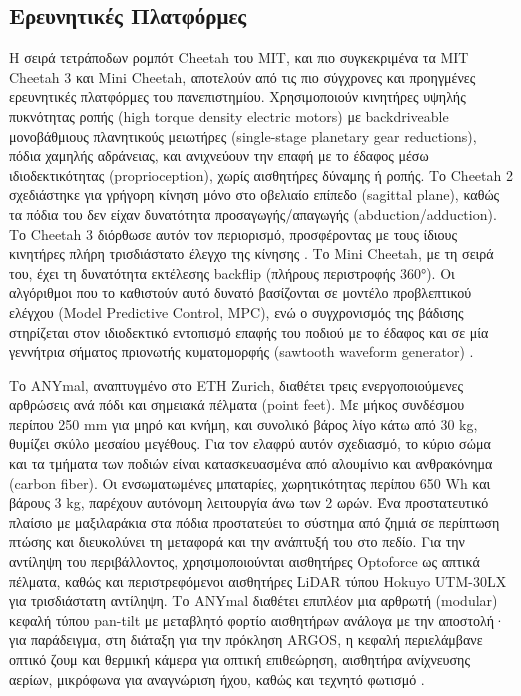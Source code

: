 \documentclass[11pt]{report}
\begin{document}
\subsection{Ερευνητικές Πλατφόρμες}
Η σειρά τετράποδων ρομπότ Cheetah του MIT, και πιο συγκεκριμένα τα MIT Cheetah 3
και Mini Cheetah, αποτελούν από τις πιο σύγχρονες και προηγμένες ερευνητικές
πλατφόρμες του πανεπιστημίου. Χρησιμοποιούν κινητήρες υψηλής πυκνότητας ροπής
(high torque density electric motors) με backdriveable μονοβάθμιους πλανητικούς
μειωτήρες (single-stage planetary gear reductions), πόδια χαμηλής αδράνειας, και
ανιχνεύουν την επαφή με το έδαφος μέσω ιδιοδεκτικότητας (proprioception), χωρίς
αισθητήρες δύναμης ή ροπής. Το Cheetah 2 σχεδιάστηκε για γρήγορη κίνηση μόνο στο
οβελιαίο επίπεδο (sagittal plane), καθώς τα πόδια του δεν είχαν δυνατότητα
προσαγωγής/απαγωγής (abduction/adduction). Το Cheetah 3 διόρθωσε αυτόν τον
περιορισμό, προσφέροντας με τους ίδιους κινητήρες πλήρη τρισδιάστατο έλεγχο της
κίνησης \cite{hyun_high_2014,bledt_mit_2018}. Το Mini Cheetah, με τη σειρά του,
έχει τη δυνατότητα εκτέλεσης backflip (πλήρους περιστροφής 360°). Οι αλγόριθμοι
που το καθιστούν αυτό δυνατό βασίζονται σε μοντέλο προβλεπτικού ελέγχου (Model
Predictive Control, MPC), ενώ ο συγχρονισμός της βάδισης στηρίζεται στον
ιδιοδεκτικό εντοπισμό επαφής του ποδιού με το έδαφος και σε μία γεννήτρια
σήματος πριονωτής κυματομορφής (sawtooth waveform generator)
\cite{kim_highly_2019}.

Το ANYmal, αναπτυγμένο στο ETH Zurich, διαθέτει τρεις ενεργοποιούμενες αρθρώσεις
ανά πόδι και σημειακά πέλματα (point feet). Με μήκος συνδέσμου περίπου 250 mm
για μηρό και κνήμη, και συνολικό βάρος λίγο κάτω από 30 kg, θυμίζει σκύλο
μεσαίου μεγέθους. Για τον ελαφρύ αυτόν σχεδιασμό, το κύριο σώμα και τα τμήματα
των ποδιών είναι κατασκευασμένα από αλουμίνιο και ανθρακόνημα (carbon fiber). Οι
ενσωματωμένες μπαταρίες, χωρητικότητας περίπου 650 Wh και βάρους 3 kg, παρέχουν
αυτόνομη λειτουργία άνω των 2 ωρών. Ένα προστατευτικό πλαίσιο με μαξιλαράκια στα
πόδια προστατεύει το σύστημα από ζημιά σε περίπτωση πτώσης και διευκολύνει τη
μεταφορά και την ανάπτυξή του στο πεδίο. Για την αντίληψη του περιβάλλοντος,
χρησιμοποιούνται αισθητήρες Optoforce ως απτικά πέλματα, καθώς και
περιστρεφόμενοι αισθητήρες LiDAR τύπου Hokuyo UTM-30LX για τρισδιάστατη
αντίληψη. Το ANYmal διαθέτει επιπλέον μια αρθρωτή (modular) κεφαλή τύπου
pan-tilt με μεταβλητό φορτίο αισθητήρων ανάλογα με την αποστολή· για παράδειγμα,
στη διάταξη για την πρόκληση ARGOS, η κεφαλή περιελάμβανε οπτικό ζουμ και
θερμική κάμερα για οπτική επιθεώρηση, αισθητήρα ανίχνευσης αερίων, μικρόφωνα για
αναγνώριση ήχου, καθώς και τεχνητό φωτισμό \cite{hutter_anymal_2016}.
\end{document}

